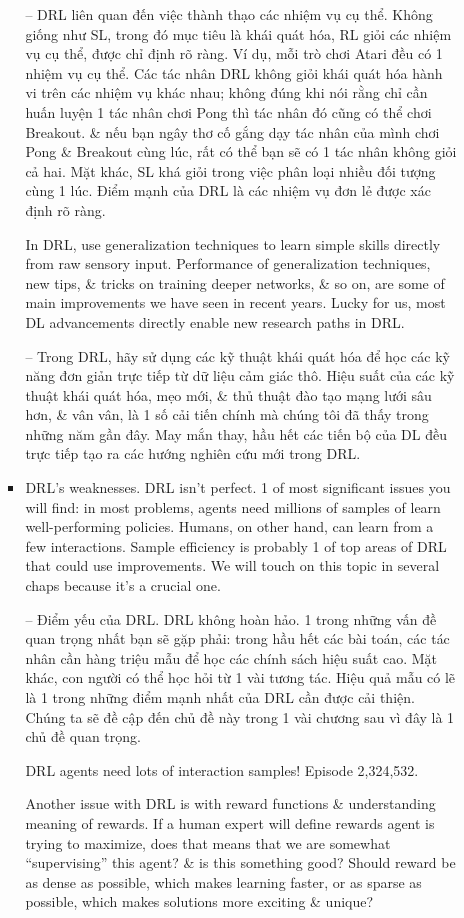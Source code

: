 \documentclass{article}
\begin{document}
\begin{itemize}
\begin{itemize}
\begin{itemize}
            -- DRL liên quan đến việc thành thạo các nhiệm vụ cụ thể. Không giống như SL, trong đó mục tiêu là khái quát hóa, RL giỏi các nhiệm vụ cụ thể, được chỉ định rõ ràng. Ví dụ, mỗi trò chơi Atari đều có 1 nhiệm vụ cụ thể. Các tác nhân DRL không giỏi khái quát hóa hành vi trên các nhiệm vụ khác nhau; không đúng khi nói rằng chỉ cần huấn luyện 1 tác nhân chơi Pong thì tác nhân đó cũng có thể chơi Breakout. \& nếu bạn ngây thơ cố gắng dạy tác nhân của mình chơi Pong \& Breakout cùng lúc, rất có thể bạn sẽ có 1 tác nhân không giỏi cả hai. Mặt khác, SL khá giỏi trong việc phân loại nhiều đối tượng cùng 1 lúc. Điểm mạnh của DRL là các nhiệm vụ đơn lẻ được xác định rõ ràng.

            In DRL, use generalization techniques to learn simple skills directly from raw sensory input. Performance of generalization techniques, new tips, \& tricks on training deeper networks, \& so on, are some of main improvements we have seen in recent years. Lucky for us, most DL advancements directly enable new research paths in DRL.

            -- Trong DRL, hãy sử dụng các kỹ thuật khái quát hóa để học các kỹ năng đơn giản trực tiếp từ dữ liệu cảm giác thô. Hiệu suất của các kỹ thuật khái quát hóa, mẹo mới, \& thủ thuật đào tạo mạng lưới sâu hơn, \& vân vân, là 1 số cải tiến chính mà chúng tôi đã thấy trong những năm gần đây. May mắn thay, hầu hết các tiến bộ của DL đều trực tiếp tạo ra các hướng nghiên cứu mới trong DRL.
            \item {\sf DRL's weaknesses.} DRL isn't perfect. 1 of most significant issues you will find: in most problems, agents need millions of samples of learn well-performing policies. Humans, on other hand, can learn from a few interactions. Sample efficiency is probably 1 of top areas of DRL that could use improvements. We will touch on this topic in several chaps because it's a crucial one.

            -- {\sf Điểm yếu của DRL.} DRL không hoàn hảo. 1 trong những vấn đề quan trọng nhất bạn sẽ gặp phải: trong hầu hết các bài toán, các tác nhân cần hàng triệu mẫu để học các chính sách hiệu suất cao. Mặt khác, con người có thể học hỏi từ 1 vài tương tác. Hiệu quả mẫu có lẽ là 1 trong những điểm mạnh nhất của DRL cần được cải thiện. Chúng ta sẽ đề cập đến chủ đề này trong 1 vài chương sau vì đây là 1 chủ đề quan trọng.

            {\sf DRL agents need lots of interaction samples!} Episode 2,324,532.

            Another issue with DRL is with reward functions \& understanding meaning of rewards. If a human expert will define rewards agent is trying to maximize, does that means that we are somewhat ``supervising'' this agent? \& is this something good? Should reward be as dense as possible, which makes learning faster, or as sparse as possible, which makes solutions more exciting \& unique?


\end{itemize}
\end{itemize}
\end{itemize}
\end{document}
